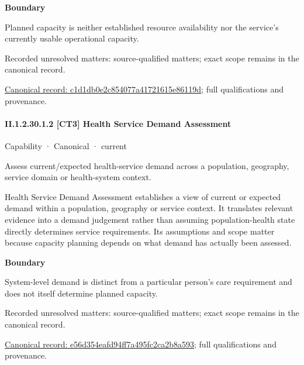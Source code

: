 \textbf{Boundary}



Planned capacity is neither established resource availability nor the service's currently usable operational capacity.


{\small Recorded unresolved matters: source-qualified matters; exact scope remains in the canonical record.}\par
{\footnotesize \href{../../../../continuum/strategy/capability/c1d1db0e2c854077a41721615e86119d.md}{Canonical record: c1d1db0e2c854077a41721615e86119d}; full qualifications and provenance.}\par
\paragraph*{II.1.2.30.1.2 [CT3] Health Service Demand Assessment}
\label{navigation:II.1.2.30.1.2}

\label{element:e56d354eafd94ff7a495fc2ca2b8a593}
{\small Capability · Canonical · current}\par

Assess current/expected health-service demand across a population, geography, service domain or health-system context.



Health Service Demand Assessment establishes a view of current or expected demand within a population, geography or service context. It translates relevant evidence into a demand judgement rather than assuming population-health state directly determines service requirements. Its assumptions and scope matter because capacity planning depends on what demand has actually been assessed.



\textbf{Boundary}



System-level demand is distinct from a particular person's care requirement and does not itself determine planned capacity.


{\small Recorded unresolved matters: source-qualified matters; exact scope remains in the canonical record.}\par
{\footnotesize \href{../../../../continuum/strategy/capability/e56d354eafd94ff7a495fc2ca2b8a593.md}{Canonical record: e56d354eafd94ff7a495fc2ca2b8a593}; full qualifications and provenance.}\par
